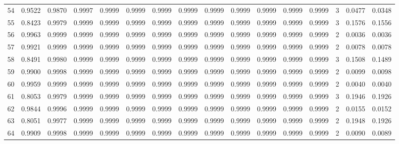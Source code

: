 \begin{tabular}{lrrrrrrrrrrrrrrr}
54  &      0.9522 &  0.9870 &  0.9997 &  0.9999 &  0.9999 &  0.9999 &  0.9999 &  0.9999 &  0.9999 &  0.9999 &   0.9999 &     0.9999 &      3 &                    0.0477 &                     0.0348 \\
55  &      0.8423 &  0.9979 &  0.9999 &  0.9999 &  0.9999 &  0.9999 &  0.9999 &  0.9999 &  0.9999 &  0.9999 &   0.9999 &     0.9999 &      3 &                    0.1576 &                     0.1556 \\
56  &      0.9963 &  0.9999 &  0.9999 &  0.9999 &  0.9999 &  0.9999 &  0.9999 &  0.9999 &  0.9999 &  0.9999 &   0.9999 &     0.9999 &      2 &                    0.0036 &                     0.0036 \\
57  &      0.9921 &  0.9999 &  0.9999 &  0.9999 &  0.9999 &  0.9999 &  0.9999 &  0.9999 &  0.9999 &  0.9999 &   0.9999 &     0.9999 &      2 &                    0.0078 &                     0.0078 \\
58  &      0.8491 &  0.9980 &  0.9999 &  0.9999 &  0.9999 &  0.9999 &  0.9999 &  0.9999 &  0.9999 &  0.9999 &   0.9999 &     0.9999 &      3 &                    0.1508 &                     0.1489 \\
59  &      0.9900 &  0.9998 &  0.9999 &  0.9999 &  0.9999 &  0.9999 &  0.9999 &  0.9999 &  0.9999 &  0.9999 &   0.9999 &     0.9999 &      2 &                    0.0099 &                     0.0098 \\
60  &      0.9959 &  0.9999 &  0.9999 &  0.9999 &  0.9999 &  0.9999 &  0.9999 &  0.9999 &  0.9999 &  0.9999 &   0.9999 &     0.9999 &      2 &                    0.0040 &                     0.0040 \\
61  &      0.8053 &  0.9979 &  0.9999 &  0.9999 &  0.9999 &  0.9999 &  0.9999 &  0.9999 &  0.9999 &  0.9999 &   0.9999 &     0.9999 &      3 &                    0.1946 &                     0.1926 \\
62  &      0.9844 &  0.9996 &  0.9999 &  0.9999 &  0.9999 &  0.9999 &  0.9999 &  0.9999 &  0.9999 &  0.9999 &   0.9999 &     0.9999 &      2 &                    0.0155 &                     0.0152 \\
63  &      0.8051 &  0.9977 &  0.9999 &  0.9999 &  0.9999 &  0.9999 &  0.9999 &  0.9999 &  0.9999 &  0.9999 &   0.9999 &     0.9999 &      2 &                    0.1948 &                     0.1926 \\
64  &      0.9909 &  0.9998 &  0.9999 &  0.9999 &  0.9999 &  0.9999 &  0.9999 &  0.9999 &  0.9999 &  0.9999 &   0.9999 &     0.9999 &      2 &                    0.0090 &                     0.0089 \\

\end{tabular}
